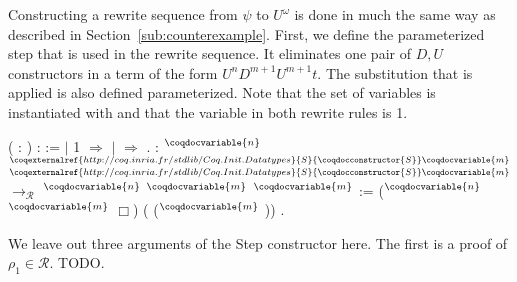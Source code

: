 Constructing a rewrite sequence from $\psi$ to $U^\omega$ is done in
much the same way as described in
Section~\ref{sub:counterexample}. First, we define the parameterized
step that is used in the rewrite sequence. It eliminates one pair of $D,
U$ constructors in a term of the form $U^n D^{m+1} U^{m+1} t$. The
substitution that is applied is also defined parameterized. Note that
the set of variables  is instantiated with
and that the variable in both rewrite rules is 1.
\begin{singlespace}
\begin{coqdoccode}
\coqdocnoindent
{}
\coqdocdefinition{$\sigma$}
 ( :
) :
 :=\coqdoceol
\coqdocindent{1.00em}
  \coqdoceol
\coqdocindent{1.00em}
\ensuremath{|} 1 \ensuremath{\Rightarrow}
\coqdoceol
\coqdocindent{1.00em}
\ensuremath{|} \coqdocvar{\_} \ensuremath{\Rightarrow}
\coqdoceol
\coqdocindent{1.00em}
.\coqdoceol
\coqdocemptyline
\coqdocnoindent
{}
\coqdocdefinition{$\pi$}
   :
$^\coqdocvariable{n}$
$^{\coqexternalref{http://coq.inria.fr/stdlib/Coq.Init.Datatypes}{S}{\coqdocconstructor{S}} \coqdocvariable{m}}$
$^{\coqexternalref{http://coq.inria.fr/stdlib/Coq.Init.Datatypes}{S}{\coqdocconstructor{S}}
\coqdocvariable{m}}$
 $\rightarrow_\mathcal{R}$
$^\coqdocvariable{n}$
$^\coqdocvariable{m}$
$^\coqdocvariable{m}$
 :=\coqdoceol
\coqdocindent{2.00em}
($^\coqdocvariable{n}$
$^\coqdocvariable{m}$ $\Box$)
(\coqdocdefinition{$\sigma$}
($^\coqdocvariable{m}$ ))
\coqdoclemma{\_}
\coqdoclemma{\_}
\coqdoclemma{\_}.\coqdoceol
\end{coqdoccode}
\end{singlespace}
We leave out three arguments of the Step constructor here. The first
is a proof of $\rho_1 \in \mathcal{R}$. TODO.
